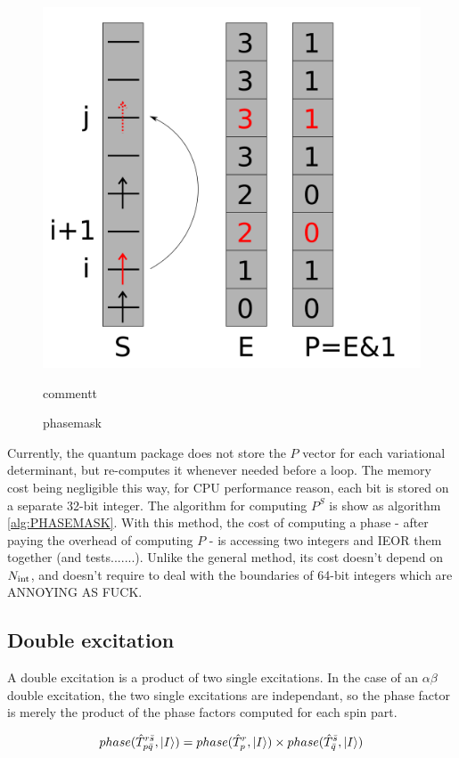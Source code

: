 \documentclass[./thesis.tex]{subfiles}
\begin{document}
                
\begin{figure}[h!]
	\begin{center}
		\includegraphics[width=0.6\columnwidth]{figures/determinant_driven/phase}
		\caption{
		\label{generators_selectors}%
		phasemask
		}
		commentt
	\end{center}
\end{figure}
        
Currently, the quantum package does not store the $P$ vector for each variational determinant, but re-computes it whenever needed before a loop. The memory cost being negligible this way, for CPU performance reason, each bit is stored on a separate 32-bit integer.
The algorithm for computing $P^S$ is show as algorithm \ref{alg:PHASEMASK}. 
With this method, the cost of computing a phase - after paying the overhead of computing $P$ - is accessing two integers and IEOR them together (and tests.......). Unlike the general method, its cost doesn't depend on ${N_\text{int}}$, and doesn't require to deal with the boundaries of 64-bit integers which are ANNOYING AS FUCK.
        

\subsection{Double excitation}







A double excitation is a product of two single excitations.
In the case of an $\alpha \beta$ double excitation, the two single excitations are independant, so the phase factor is merely the product of the phase factors computed for each spin part. 


\begin{equation}
phase(\hat T_{p \bar q}^{r \bar s}, \ket I) = phase(\hat T_{p}^{r}, \ket I) \times phase(\hat T_{ \bar q}^{ \bar s}, \ket I) 
\end{equation}
\end{document}
